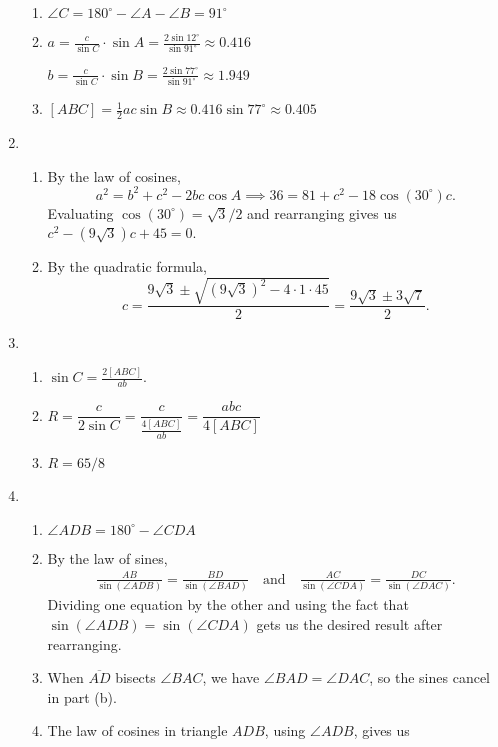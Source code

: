 \begin{enumerate}
\begin{enumerate}
\item $\angle C = 180^{\circ} - \angle A - \angle B = 91^{\circ}$
\item $a = \frac{c}{\sin C}\cdot\sin A = \frac{2\sin 12^{\circ}}{\sin 91^{\circ}}\approx 0.416$\par
$b = \frac{c}{\sin C}\cdot\sin B = \frac{2\sin 77^{\circ}}{\sin 91^{\circ}}\approx 1.949$
\item $[ABC] = \frac{1}{2}ac\sin B\approx 0.416\sin 77^{\circ}\approx 0.405$
\end{enumerate}
\item \begin{enumerate}
\item By the law of cosines,
\begin{equation*}
a^2 = b^2 + c^2 - 2bc\cos A\implies 36 = 81 + c^2 - 18\cos(30^{\circ})c.
\end{equation*}
Evaluating $\cos(30^{\circ}) = \sqrt{3}/2$ and rearranging gives us $c^2 - (9\sqrt{3})c + 45 = 0$.
\item By the quadratic formula,
\begin{equation*}
c = \frac{9\sqrt{3}\pm\sqrt{(9\sqrt{3})^2 - 4\cdot 1\cdot 45}}{2} = \frac{9\sqrt{3}\pm 3\sqrt{7}}{2}.
\end{equation*}
\end{enumerate}
\item \begin{enumerate}
\item $\sin C = \frac{2[ABC]}{ab}$.
\item $R = \dfrac{c}{2\sin C} = \dfrac{c}{\frac{4[ABC]}{ab}} = \dfrac{abc}{4[ABC]}$
\item $R = 65/8$
\end{enumerate}
\item \begin{enumerate}
\item $\angle ADB = 180^{\circ} - \angle CDA$
\item By the law of sines,
\begin{align*}
\frac{AB}{\sin(\angle ADB)} = \frac{BD}{\sin(\angle BAD)}\quad\text{and}\quad\frac{AC}{\sin(\angle CDA)} = \frac{DC}{\sin(\angle DAC)}.
\end{align*}
Dividing one equation by the other and using the fact that $\sin(\angle ADB) = \sin(\angle CDA)$ gets us the desired result after rearranging.
\item When $\overline{AD}$ bisects $\angle BAC$, we have $\angle BAD = \angle DAC$, so the sines cancel in part (b).
\item The law of cosines in triangle $ADB$, using $\angle ADB$, gives us

\end{enumerate}
\end{enumerate}
